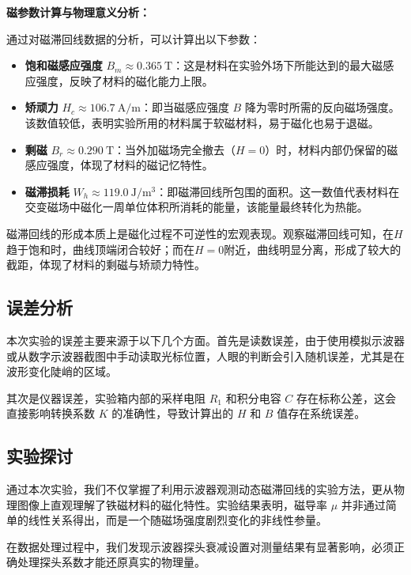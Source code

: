 \documentclass{../../templates/Report}%
\begin{document}
\begin{fullreportonly}
    \textbf{磁参数计算与物理意义分析：}

    通过对磁滞回线数据的分析，可以计算出以下参数：
    \begin{itemize}
        \item \textbf{饱和磁感应强度} $B_m \approx \SI{0.365}{\tesla}$：这是材料在实验外场下所能达到的最大磁感应强度，反映了材料的磁化能力上限。
        \item \textbf{矫顽力} $H_c \approx \SI{106.7}{\ampere\per\meter}$：即当磁感应强度 $B$ 降为零时所需的反向磁场强度。该数值较低，表明实验所用的材料属于软磁材料，易于磁化也易于退磁。
        \item \textbf{剩磁} $B_r \approx \SI{0.290}{\tesla}$：当外加磁场完全撤去（$H=0$）时，材料内部仍保留的磁感应强度，体现了材料的磁记忆特性。
        \item \textbf{磁滞损耗} $W_h \approx \SI{119.0}{\joule\per\meter\cubed}$：即磁滞回线所包围的面积。这一数值代表材料在交变磁场中磁化一周单位体积所消耗的能量，该能量最终转化为热能。
    \end{itemize}

    磁滞回线的形成本质上是磁化过程不可逆性的宏观表现。观察磁滞回线可知，在$H$趋于饱和时，曲线顶端闭合较好；而在$H=0$附近，曲线明显分离，形成了较大的截距，体现了材料的剩磁与矫顽力特性。

    \subsection{误差分析}

    本次实验的误差主要来源于以下几个方面。首先是读数误差，由于使用模拟示波器或从数字示波器截图中手动读取光标位置，人眼的判断会引入随机误差，尤其是在波形变化陡峭的区域。

    其次是仪器误差，实验箱内部的采样电阻 $R_1$ 和积分电容 $C$ 存在标称公差，这会直接影响转换系数 $K$ 的准确性，导致计算出的 $H$ 和 $B$ 值存在系统误差。

    \subsection{实验探讨}

    通过本次实验，我们不仅掌握了利用示波器观测动态磁滞回线的实验方法，更从物理图像上直观理解了铁磁材料的磁化特性。实验结果表明，磁导率 $\mu$ 并非通过简单的线性关系得出，而是一个随磁场强度剧烈变化的非线性参量。

    在数据处理过程中，我们发现示波器探头衰减设置对测量结果有显著影响，必须正确处理探头系数才能还原真实的物理量。


\end{fullreportonly}
\end{document}
